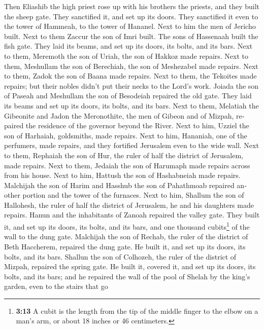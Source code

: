 \begin{paracol}{2}
\begin{otherlanguage}{english}
 Then Eliashib the high priest rose up with his brothers
the priests, and they built the sheep gate. They sanctified it, and set
up its doors. They sanctified it even to the tower of Hammeah, to the
tower of Hananel.  Next to him the men of Jericho built.
Next to them Zaccur the son of Imri built.  The sons of
Hassenaah built the fish gate. They laid its beams, and set up its
doors, its bolts, and its bars.  Next to them, Meremoth
the son of Uriah, the son of Hakkoz made repairs. Next to them,
Meshullam the son of Berechiah, the son of Meshezabel made repairs. Next
to them, Zadok the son of Baana made repairs.  Next to
them, the Tekoites made repairs; but their nobles didn't put their necks
to the Lord's work.  Joiada the son of Paseah and
Meshullam the son of Besodeiah repaired the old gate. They laid its
beams and set up its doors, its bolts, and its bars.  Next
to them, Melatiah the Gibeonite and Jadon the Meronothite, the men of
Gibeon and of Mizpah, repaired the residence of the governor beyond the
River.  Next to him, Uzziel the son of Harhaiah,
goldsmiths, made repairs. Next to him, Hananiah, one of the perfumers,
made repairs, and they fortified Jerusalem even to the wide wall.
 Next to them, Rephaiah the son of Hur, the ruler of half
the district of Jerusalem, made repairs.  Next to them,
Jedaiah the son of Harumaph made repairs across from his house. Next to
him, Hattush the son of Hashabneiah made repairs. 
Malchijah the son of Harim and Hasshub the son of Pahathmoab repaired
another portion and the tower of the furnaces.  Next to
him, Shallum the son of Hallohesh, the ruler of half the district of
Jerusalem, he and his daughters made repairs.  Hanun and
the inhabitants of Zanoah repaired the valley gate. They built it, and
set up its doors, its bolts, and its bars, and one thousand
cubits\footnote{\textbf{3:13} A cubit is the length from the tip of the
  middle finger to the elbow on a man's arm, or about 18 inches or 46
  centimeters.} of the wall to the dung gate.  Malchijah
the son of Rechab, the ruler of the district of Beth Haccherem, repaired
the dung gate. He built it, and set up its doors, its bolts, and its
bars.  Shallun the son of Colhozeh, the ruler of the
district of Mizpah, repaired the spring gate. He built it, covered it,
and set up its doors, its bolts, and its bars; and he repaired the wall
of the pool of Shelah by the king's garden, even to the stairs that go

\end{otherlanguage}
\end{paracol}
